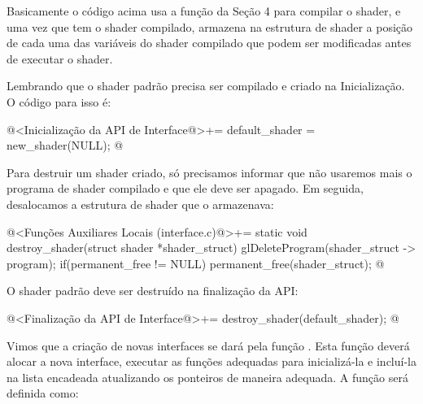 Basicamente o código acima usa a função da Seção 4 para compilar o
shader, e uma vez que tem o shader compilado, armazena na estrutura de
shader a posição de cada uma das variáveis do shader compilado que
podem ser modificadas antes de executar o shader.

Lembrando que o shader padrão precisa ser compilado e criado na
Inicialização. O código para isso é:

\iniciocodigo
@<Inicialização da API de Interface@>+=
default_shader = new_shader(NULL);
@
\fimcodigo

Para destruir um shader criado, só precisamos informar que não
usaremos mais o programa de shader compilado e que ele deve ser
apagado. Em seguida, desalocamos a estrutura de shader que o
armazenava:

\iniciocodigo
@<Funções Auxiliares Locais (interface.c)@>+=
static void destroy_shader(struct shader *shader_struct){
  glDeleteProgram(shader_struct -> program);
  if(permanent_free != NULL)
    permanent_free(shader_struct);
}
@
\fimcodigo

O shader padrão deve ser destruído na finalização da API:

\iniciocodigo
@<Finalização da API de Interface@>+=
destroy_shader(default_shader);
@
\fimcodigo


Vimos que a criação de novas interfaces se dará pela função
. Esta função deverá alocar a nova
interface, executar as funções adequadas para inicializá-la e
incluí-la na lista encadeada atualizando os ponteiros de maneira
adequada. A função será definida como:

